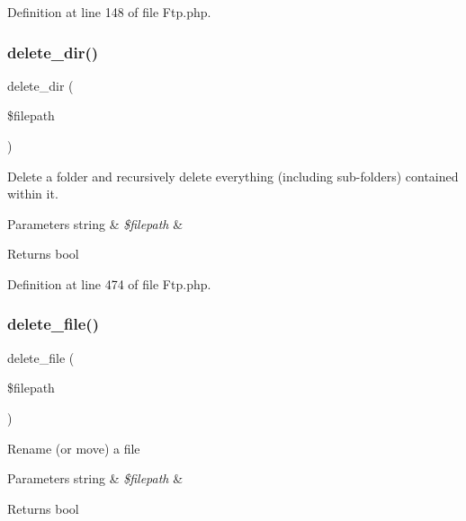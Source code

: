Definition at line 148 of file Ftp.\+php.

\mbox{\label{class_c_i___f_t_p_af09b3ab08984b145506dcff4f75a051c}} 
\subsubsection{\texorpdfstring{delete\_dir()}{delete\_dir()}}
{\footnotesize\ttfamily delete\+\_\+dir (\begin{DoxyParamCaption}\item[{}]{\$filepath }\end{DoxyParamCaption})}

Delete a folder and recursively delete everything (including sub-\/folders) contained within it.


\begin{DoxyParams}[1]{Parameters}
string & {\em \$filepath} & \\
\hline
\end{DoxyParams}
\begin{DoxyReturn}{Returns}
bool 
\end{DoxyReturn}


Definition at line 474 of file Ftp.\+php.

\mbox{\label{class_c_i___f_t_p_aad793fb503643d98b58426421718e18a}} 
\subsubsection{\texorpdfstring{delete\_file()}{delete\_file()}}
{\footnotesize\ttfamily delete\+\_\+file (\begin{DoxyParamCaption}\item[{}]{\$filepath }\end{DoxyParamCaption})}

Rename (or move) a file


\begin{DoxyParams}[1]{Parameters}
string & {\em \$filepath} & \\
\hline
\end{DoxyParams}
\begin{DoxyReturn}{Returns}
bool 
\end{DoxyReturn}



